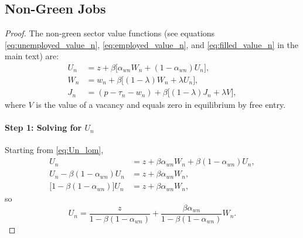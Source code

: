 \documentclass[preprint,12pt]{elsarticle}
\begin{document}
\subsection{Non-Green Jobs}
\label{app nongreen wage}

\begin{proof}
The non-green sector value functions (see equations \eqref{eq:unemployed_value_n}, \eqref{eq:employed_value_n}, and \eqref{eq:filled_value_n} in the main text) are:
\begin{align}
U_n &= z + \beta\big[\alpha_{wn} W_n + (1-\alpha_{wn}) U_n\big], \label{eq:Un_lom}\\
W_n &= w_n + \beta\big[(1-\lambda) W_n + \lambda U_n\big], \label{eq:Wn_lom}\\
J_n &= (p-\tau_n-w_n) + \beta\big[(1-\lambda) J_n + \lambda V\big], \label{eq:Jn_lom}
\end{align}
where \(V\) is the value of a vacancy and equals zero in equilibrium by free entry.

\paragraph{Step 1: Solving for \(U_n\)}
Starting from \eqref{eq:Un_lom},
\begin{align}
U_n
&= z + \beta\alpha_{wn} W_n + \beta(1-\alpha_{wn})U_n,\\
U_n - \beta(1-\alpha_{wn})U_n
&= z + \beta\alpha_{wn} W_n,\\
\big[1-\beta(1-\alpha_{wn})\big]U_n
&= z + \beta\alpha_{wn} W_n,
\end{align}
so
\begin{equation}
U_n = \frac{z}{1-\beta(1-\alpha_{wn})}
+ \frac{\beta\alpha_{wn}}{1-\beta(1-\alpha_{wn})}W_n.
\label{eq:Un_linear}
\end{equation}


\end{proof}
\end{document}
